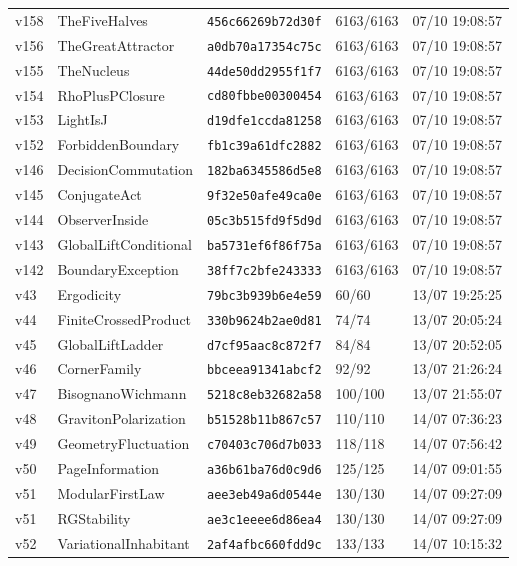 \documentclass[11pt]{article}
\theoremstyle{definition}\newtheorem{deriv}{Derivação}
\begin{document}
{\begin{longtable}{@{}lllll@{}}
v158 & TheFiveHalves & \texttt{456c66269b72d30f} & 6163/6163 & 07/10 19:08:57 \\
v156 & TheGreatAttractor & \texttt{a0db70a17354c75c} & 6163/6163 & 07/10 19:08:57 \\
v155 & TheNucleus & \texttt{44de50dd2955f1f7} & 6163/6163 & 07/10 19:08:57 \\
v154 & RhoPlusPClosure & \texttt{cd80fbbe00300454} & 6163/6163 & 07/10 19:08:57 \\
v153 & LightIsJ & \texttt{d19dfe1ccda81258} & 6163/6163 & 07/10 19:08:57 \\
v152 & ForbiddenBoundary & \texttt{fb1c39a61dfc2882} & 6163/6163 & 07/10 19:08:57 \\
v146 & DecisionCommutation & \texttt{182ba6345586d5e8} & 6163/6163 & 07/10 19:08:57 \\
v145 & ConjugateAct & \texttt{9f32e50afe49ca0e} & 6163/6163 & 07/10 19:08:57 \\
v144 & ObserverInside & \texttt{05c3b515fd9f5d9d} & 6163/6163 & 07/10 19:08:57 \\
v143 & GlobalLiftConditional & \texttt{ba5731ef6f86f75a} & 6163/6163 & 07/10 19:08:57 \\
v142 & BoundaryException & \texttt{38ff7c2bfe243333} & 6163/6163 & 07/10 19:08:57 \\
v43 & Ergodicity & \texttt{79bc3b939b6e4e59} & 60/60 & 13/07 19:25:25 \\
v44 & FiniteCrossedProduct & \texttt{330b9624b2ae0d81} & 74/74 & 13/07 20:05:24 \\
v45 & GlobalLiftLadder & \texttt{d7cf95aac8c872f7} & 84/84 & 13/07 20:52:05 \\
v46 & CornerFamily & \texttt{bbceea91341abcf2} & 92/92 & 13/07 21:26:24 \\
v47 & BisognanoWichmann & \texttt{5218c8eb32682a58} & 100/100 & 13/07 21:55:07 \\
v48 & GravitonPolarization & \texttt{b51528b11b867c57} & 110/110 & 14/07 07:36:23 \\
v49 & GeometryFluctuation & \texttt{c70403c706d7b033} & 118/118 & 14/07 07:56:42 \\
v50 & PageInformation & \texttt{a36b61ba76d0c9d6} & 125/125 & 14/07 09:01:55 \\
v51 & ModularFirstLaw & \texttt{aee3eb49a6d0544e} & 130/130 & 14/07 09:27:09 \\
v51 & RGStability & \texttt{ae3c1eeee6d86ea4} & 130/130 & 14/07 09:27:09 \\
v52 & VariationalInhabitant & \texttt{2af4afbc660fdd9c} & 133/133 & 14/07 10:15:32 \\

\end{longtable}}
\end{document}
